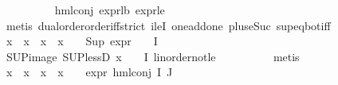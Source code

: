 \begin{isabellebody}
\ \ \ \ \ \ \ \ \isamarkupfalse%
\ hml{\isacharunderscore}{\kern0pt}conj\ expr{\isacharunderscore}{\kern0pt}{}{\isacharunderscore}{\kern0pt}lb\ expr{\isacharunderscore}{\kern0pt}{}{\isacharunderscore}{\kern0pt}le{\isacharunderscore}{\kern0pt}{}\isanewline
\ \ \ \ \ \ \ \ \isamarkupfalse%
\ {\isacharparenleft}{\kern0pt}metis\ dual{\isacharunderscore}{\kern0pt}order{\isachardot}{\kern0pt}order{\isacharunderscore}{\kern0pt}iff{\isacharunderscore}{\kern0pt}strict\ ileI{}\ one{\isacharunderscore}{\kern0pt}add{\isacharunderscore}{\kern0pt}one\ plus{\isacharunderscore}{\kern0pt}{}{\isacharunderscore}{\kern0pt}eSuc{\isacharparenleft}{\kern0pt}{}{\isacharparenright}{\kern0pt}\ sup{\isacharunderscore}{\kern0pt}eq{\isacharunderscore}{\kern0pt}bot{\isacharunderscore}{\kern0pt}iff{\isacharparenright}{\kern0pt}\ \isanewline
\ \ \ \ \ \ \isamarkupfalse%
\ {\isachardoublequoteopen}{\isacharparenleft}{\kern0pt}x{}{}\ {\isacharbackquote}{\kern0pt}\ x{}{}\ {\isasymunion}\ x{}{}\ {\isacharbackquote}{\kern0pt}\ x{}{}{\isacharparenright}{\kern0pt}\ {\isasymnoteq}\ {\isacharbraceleft}{\kern0pt}{\isacharbraceright}{\kern0pt}\ {\isasymlongrightarrow}\ Sup\ {\isacharparenleft}{\kern0pt}{\isacharparenleft}{\kern0pt}expr{\isacharunderscore}{\kern0pt}{}\ {\isasymcirc}\ {\isasymPhi}{\isacharparenright}{\kern0pt}\ {\isacharbackquote}{\kern0pt}\ I{\isacharparenright}{\kern0pt}\ {\isasymge}\ {}{\isachardoublequoteclose}\isanewline
\ \ \ \ \ \ \ \ \isamarkupfalse%
\ SUP{\isacharunderscore}{\kern0pt}image\ SUP{\isacharunderscore}{\kern0pt}lessD\ {\isacartoucheopen}x\ {\isasymin}\ {\isasymPhi}\ {\isacharbackquote}{\kern0pt}\ I{\isacartoucheclose}\ linorder{\isacharunderscore}{\kern0pt}not{\isacharunderscore}{\kern0pt}le\isanewline
\ \ \ \ \ \ \ \ \isamarkupfalse%
\ metis\isanewline
\ \ \ \ \ \ \isamarkupfalse%
\ {\isachardoublequoteopen}{\isacharparenleft}{\kern0pt}x{}{}\ {\isacharbackquote}{\kern0pt}\ x{}{}\ {\isasymunion}\ x{}{}\ {\isacharbackquote}{\kern0pt}\ x{}{}{\isacharparenright}{\kern0pt}\ {\isasymnoteq}\ {\isacharbraceleft}{\kern0pt}{\isacharbraceright}{\kern0pt}\ {\isasymlongrightarrow}\ expr{\isacharunderscore}{\kern0pt}{}\ {\isacharparenleft}{\kern0pt}hml{\isacharunderscore}{\kern0pt}conj\ I\ J\ {\isasymPhi}{\isacharparenright}{\kern0pt}\ {\isasymge}\ {}{\isachardoublequoteclose}\isanewline

\end{isabellebody}

